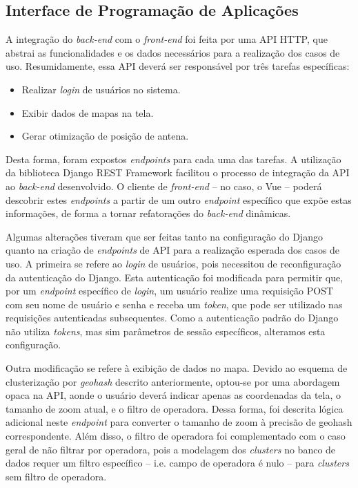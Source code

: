 \documentclass[]{politex}
\begin{document}
\subsection{Interface de Programação de Aplicações}

A integração do \textit{back-end} com o \textit{front-end} foi feita por uma API
HTTP, que abstrai as funcionalidades e os dados necessários para a realização
dos casos de uso. Resumidamente, essa API deverá ser responsável por três
tarefas específicas:

\begin{itemize}
\item Realizar \textit{login} de usuários no sistema.
\item Exibir dados de mapas na tela.
\item Gerar otimização de posição de antena.
\end{itemize}

Desta forma, foram expostos \textit{endpoints} para cada uma das tarefas. A
utilização da biblioteca Django REST Framework facilitou o processo de
integração da API ao \textit{back-end} desenvolvido. O cliente de
\textit{front-end} -- no caso, o Vue -- poderá descobrir estes
\textit{endpoints} a partir de um outro \textit{endpoint} específico que expõe
estas informações, de forma a tornar refatorações do \textit{back-end}
dinâmicas.

Algumas alterações tiveram que ser feitas tanto na configuração do Django quanto
na criação de \textit{endpoints} de API para a realização esperada dos casos de
uso. A primeira se refere ao \textit{login} de usuários, pois necessitou de
reconfiguração da autenticação do Django. Esta autenticação foi modificada para
permitir que, por um \textit{endpoint} específico de \textit{login}, um usuário
realize uma requisição POST com seu nome de usuário e senha e receba um
\textit{token}, que pode ser utilizado nas requisições autenticadas
subsequentes. Como a autenticação padrão do Django não utiliza \textit{tokens},
mas sim parâmetros de sessão específicos, alteramos esta configuração.

Outra modificação se refere à exibição de dados no mapa. Devido ao esquema de
clusterização por \textit{geohash} descrito anteriormente, optou-se por uma
abordagem opaca na API, aonde o usuário deverá indicar apenas as coordenadas da
tela, o tamanho de zoom atual, e o filtro de operadora. Dessa forma, foi
descrita lógica adicional neste \textit{endpoint} para converter o tamanho de
zoom à precisão de geohash correspondente. Além disso, o filtro de operadora foi
complementado com o caso geral de não filtrar por operadora, pois a modelagem
dos \textit{clusters} no banco de dados requer um filtro específico -- i.e.
campo de operadora é nulo -- para \textit{clusters} sem filtro de operadora.
\end{document}
